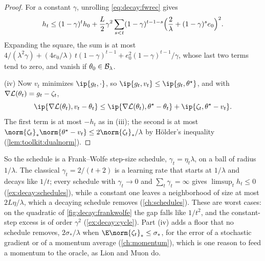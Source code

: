 \begin{refsection}
\begin{proof}
For a constant $\gamma$, unrolling \eqref{eq:decay:fwrec} gives
\[
  h_t\le(1-\gamma)^th_0+\frac L2\gamma^2\sum_{s<t}(1-\gamma)^{t-1-s}\Bigl(\frac2\lambda+(1-\gamma)^se_0\Bigr)^2 .
\]
Expanding the square, the sum is at most $4/(\lambda^2\gamma)+(4e_0/\lambda)\,t(1-\gamma)^{t-1}+e_0^2(1-\gamma)^{t-1}/\gamma$, whose last two terms tend to zero, and vanish if $\theta_0\in\mathcal{B}_\lambda$.

(iv) Now $v_t$ minimizes $\ip{g_t,\cdot}$, so $\ip{g_t,v_t}\le\ip{g_t,\theta^\star}$, and with $\nabla\mathcal{L}(\theta_t)=g_t-\zeta_t$,
\[
  \ip{\nabla\Loss(\theta_t),v_t-\theta_t}\le\ip{\nabla\Loss(\theta_t),\theta^\star-\theta_t}+\ip{\zeta_t,\theta^\star-v_t} .
\]
The first term is at most $-h_t$ as in (iii); the second is at most $\norm{\zeta_t}_*\norm{\theta^\star-v_t}\le2\norm{\zeta_t}_*/\lambda$ by Hölder's inequality (\cref{lem:toolkit:dualnorm}).
\end{proof}

So the schedule is a Frank--Wolfe step-size schedule, $\gamma_t=\eta_t\lambda$, on a ball of radius $1/\lambda$. The classical $\gamma_t=2/(t+2)$ is a learning rate that starts at $1/\lambda$ and decays like $1/t$; every schedule with $\gamma_t\to0$ and $\sum_t\gamma_t=\infty$ gives $\limsup_th_t\le0$ (\cref{ex:decay:schedules}), while a constant one leaves a neighborhood of size at most $2L\eta/\lambda$, which a decaying schedule removes (\cref{ch:schedules}). These are worst cases: on the quadratic of \cref{fig:decay:frankwolfe} the gap falls like $1/t^2$, and the constant-step excess is of order $\gamma^2$ (\cref{ex:decay:cycle}). Part (iv) adds a floor that no schedule removes, $2\sigma_*/\lambda$ when $\E\norm{\zeta_t}_*\le\sigma_*$, for the error of a stochastic gradient or of a momentum average (\cref{ch:momentum}), which is one reason to feed a momentum to the oracle, as Lion and Muon do.


\end{refsection}
